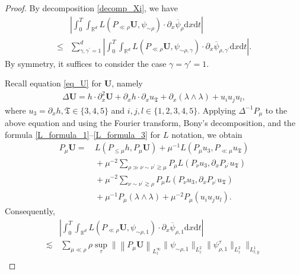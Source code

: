\documentclass[11pt,letterpaper,reqno]{amsart}
\numberwithin{equation}{section}
\theoremstyle{definition}
\theoremstyle{remark}
\begin{document}
\begin{proof} 	 By decomposition \eqref{decomp_Xi},  we have
\begin{align}
       	& \left|\int_0^T \int_{\mathbb{R}^{d}} L( P_{\ll \rho } \mathbf{U},   \psi_{\sim \rho}) \cdot\partial_x  \overline{\psi}_{\rho} \mathrm{ d} x\mathrm{ d} t\right| \label{lem_J1.decom}\\
            \leq &	  \sum_{\gamma,\gamma^\prime=1}^d\left|\int_0^T \int_{\mathbb{R}^{d}} L( P_{\ll \rho } \mathbf{U},   \psi_{\sim \rho ,\gamma}) \cdot\partial_x  \overline{\psi}_{\rho,\gamma^\prime} \mathrm{ d} x\mathrm{ d} t\right|. \nonumber
\end{align}
By symmetry, it suffices to consider the case $\gamma=\gamma'=1$.

Recall equation  \eqref{eq_U} for  $ \mathbf{U} $, namely
\begin{align*}
    \Delta \mathbf{U} =h\cdot\partial_x^2 \mathbf{U}
+
\partial_xh\cdot\partial_xu_{\mathfrak T}+
\partial_x(\lambda\wedge\lambda)
+
u_i u_j u_l,
\end{align*}
where  \(u_3=\partial_x h,  \mathfrak{T}\in\{3,4,5\}\) and $ i,j,l\in\{1,2,3,4,5\} $.
Applying $\Delta^{-1}P_\mu$ to the above equation and using the Fourier transform, Bony's decomposition, and the formula \eqref{L_formula_1}--\eqref{L_formula_3} for    $L$ notation, we obtain
\begin{equation}\label{Bony_U}
    \begin{aligned}  
	P_\mu     \mathbf{U} 
= &\,   L(P_{\leq  \mu} h, P_\mu  \mathbf{U} )+ \mu^{-1} L(P_\mu u_3, P_{\ll \mu } u_{\mathfrak{T}}) \\
&\,+\mu^{-2}\sum_{ \rho\gg\nu\sim \nu^\prime \gtrsim \mu} P_\mu L (P_\nu u_3, \partial_x P_{\nu^\prime}  u_{\mathfrak{T}} ) \\
&\, + \mu^{-2}\sum_{ \nu\sim \nu^\prime \gtrsim \rho}  P_\mu L (P_\nu u_3, \partial_x P_{\nu^\prime}  u_{\mathfrak{T}}) \\
 &\, +\mu^{-1}  P_\mu (\lambda\wedge\lambda)+\mu^{-2}P_\mu (u_iu_ju_l). 
\end{aligned}
\end{equation}
Consequently,
\begin{align}
& \left|\int_0^T \int_{\mathbb{R}^{d}} L( P_{\ll \rho } \mathbf{U},   \psi_{\sim \rho,1}) \cdot\partial_x  \overline{\psi}_{\rho,1} \mathrm{ d} x\mathrm{ d} t\right|\nonumber\\
    		\lesssim&\,   	\sum_{\mu \ll \rho}    \rho       \sup_{\tau} \big\|\left\|P_{\mu} \mathbf{U}  \right\|_{L^\infty_z} \|  \psi_{\sim \rho,1}  \|_{L^2_z}   \|    \psi_{\rho,1}^\tau \|_{L^2_z}   \big\|_{L^1_{t,y}}\label{J11t0}\\

\end{align}
\end{proof}
\end{document}
